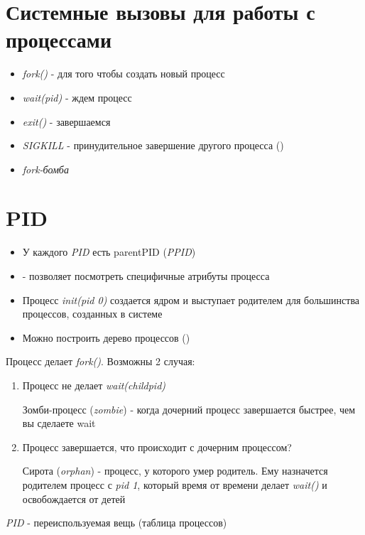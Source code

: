 \documentclass[../lectures.tex]{subfiles}
\begin{document}
\section{Системные вызовы для работы с процессами}
\begin{itemize}
    \item \emph{fork()} - для того чтобы создать новый процесс
    \item \emph{wait(pid)} - ждем процесс
    \item \emph{exit()} - завершаемся
    \item \emph{SIGKILL} - принудительное завершение другого процесса ()
    \item \emph{fork-бомба}
\end{itemize}

\section{PID}
\begin{itemize}
    \item У каждого \emph{PID} есть parentPID (\emph{PPID})

    \item {} - позволяет посмотреть специфичные атрибуты процесса

    \item Процесс \emph{init(pid 0)} создается ядром и выступает родителем для большинства процессов, созданных в системе

    \item Можно построить дерево процессов ()
\end{itemize}

Процесс делает \emph{fork()}. Возможны 2 случая:
\begin{enumerate}
    \item 
        Процесс не делает \emph{wait(childpid)}

        Зомби-процесс (\emph{zombie}) - когда дочерний процесс завершается быстрее, чем вы сделаете wait
    \item 
        Процесс завершается, что происходит с дочерним процессом?

        Сирота (\emph{orphan}) - процесс, у которого умер родитель. 
        Ему назначется родителем процесс с \emph{pid 1}, который время от времени делает \emph{wait()} и освобождается от детей
\end{enumerate}
\emph{PID} - переиспользуемая вещь (таблица процессов)
\end{document}
